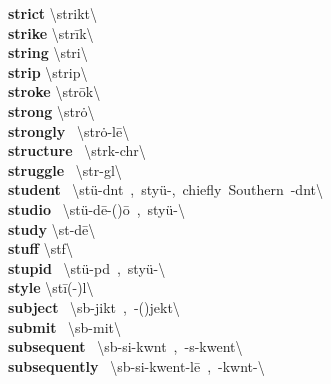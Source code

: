 \documentclass[10pt,a4paper]{article}
\begin{document}
\begin{multicols}{2}
\textbf{ strict }\quad \textbackslash \textprimstress strikt\textbackslash \\
\textbf{ strike }\quad \textbackslash \textprimstress str\={i}k\textbackslash \\
\textbf{ string }\quad \textbackslash \textprimstress stri\engma \textbackslash \\
\textbf{ strip }\quad \textbackslash \textprimstress strip\textbackslash \\
\textbf{ stroke }\quad \textbackslash \textprimstress str\={o}k\textbackslash \\
\textbf{ strong }\quad \textbackslash \textprimstress str\.{o}\engma \textbackslash \\
\textbf{ strongly }\quad \ \textbackslash \textprimstress str\.{o}\engma -l\={e}\textbackslash \\
\textbf{ structure }\quad \ \textbackslash \textprimstress str\textschwa k-ch\textschwa r\textbackslash \\
\textbf{ struggle }\quad \ \textbackslash \textprimstress str\textschwa -g\textschwa l\textbackslash \\
\textbf{ student }\quad \ \textbackslash \textprimstress st\"{u}-d\textsuperscript{\textreve}nt\ ,\ \textprimstress sty\"{u}-,\ chiefly\ Southern\ -d\textschwa nt\textbackslash \\
\textbf{ studio }\quad \ \textbackslash \textprimstress st\"{u}-d\={e}-(\textsecstress )\={o}\ ,\ \textprimstress sty\"{u}-\textbackslash \\
\textbf{ study }\quad \textbackslash \textprimstress st\textschwa -d\={e}\textbackslash \\
\textbf{ stuff }\quad \textbackslash \textprimstress st\textschwa f\textbackslash \\
\textbf{ stupid }\quad \ \textbackslash \textprimstress st\"{u}-p\textschwa d\ ,\ \textprimstress sty\"{u}-\textbackslash \\
\textbf{ style }\quad \textbackslash \textprimstress st\={i}(-\textschwa )l\textbackslash \\
\textbf{ subject }\quad \ \textbackslash \textprimstress s\textschwa b-jikt\ ,\ -(\textsecstress )jekt\textbackslash \\
\textbf{ submit }\quad \ \textbackslash s\textschwa b-\textprimstress mit\textbackslash \\
\textbf{ subsequent }\quad \ \textbackslash \textprimstress s\textschwa b-si-kw\textschwa nt\ ,\ -s\textschwa -\textsecstress kwent\textbackslash \\
\textbf{ subsequently }\quad \ \textbackslash \textprimstress s\textschwa b-si-\textsecstress kwent-l\={e}\ ,\ -kw\textschwa nt-\textbackslash \\

\end{multicols}
\end{document}
